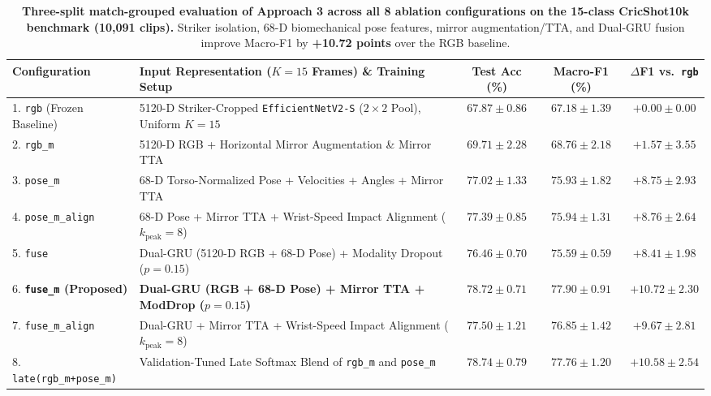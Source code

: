 \begin{table}[t]
\centering
\caption{\textbf{Three-split match-grouped evaluation of Approach 3 across all 8 ablation configurations on the 15-class CricShot10k benchmark (10,091 clips).} Striker isolation, 68-D biomechanical pose features, mirror augmentation/TTA, and Dual-GRU fusion improve Macro-F1 by \textbf{+10.72 points} over the RGB baseline.}
\label{tab:cricshot10k}
\small
\begin{tabular}{llccc}
\toprule
\textbf{Configuration} & \textbf{Input Representation ($K=15$ Frames) \& Training Setup} & \textbf{Test Acc (\%)} & \textbf{Macro-F1 (\%)} & \textbf{$\Delta$F1 vs.\ \texttt{rgb}} \\
\midrule
1. \texttt{rgb} (Frozen Baseline) & 5120-D Striker-Cropped \texttt{EfficientNetV2-S} ($2\times2$ Pool), Uniform $K=15$ & $67.87 \pm 0.86$ & $67.18 \pm 1.39$ & $+0.00 \pm 0.00$ \\
2. \texttt{rgb\_m} & 5120-D RGB + Horizontal Mirror Augmentation \& Mirror TTA & $69.71 \pm 2.28$ & $68.76 \pm 2.18$ & $+1.57 \pm 3.55$ \\
3. \texttt{pose\_m} & 68-D Torso-Normalized Pose + Velocities + Angles + Mirror TTA & $77.02 \pm 1.33$ & $75.93 \pm 1.82$ & $+8.75 \pm 2.93$ \\
4. \texttt{pose\_m\_align} & 68-D Pose + Mirror TTA + Wrist-Speed Impact Alignment ($k_{\text{peak}}=8$) & $77.39 \pm 0.85$ & $75.94 \pm 1.31$ & $+8.76 \pm 2.64$ \\
\midrule
5. \texttt{fuse} & Dual-GRU (5120-D RGB + 68-D Pose) + Modality Dropout ($p=0.15$) & $76.46 \pm 0.70$ & $75.59 \pm 0.59$ & $+8.41 \pm 1.98$ \\
6. \textbf{\texttt{fuse\_m} (Proposed)} & \textbf{Dual-GRU (RGB + 68-D Pose) + Mirror TTA + ModDrop ($p=0.15$)} & $\mathbf{78.72 \pm 0.71}$ & $\mathbf{77.90 \pm 0.91}$ & $\mathbf{+10.72 \pm 2.30}$ \\
7. \texttt{fuse\_m\_align} & Dual-GRU + Mirror TTA + Wrist-Speed Impact Alignment ($k_{\text{peak}}=8$) & $77.50 \pm 1.21$ & $76.85 \pm 1.42$ & $+9.67 \pm 2.81$ \\
8. \texttt{late(rgb\_m+pose\_m)} & Validation-Tuned Late Softmax Blend of \texttt{rgb\_m} and \texttt{pose\_m} & $\mathbf{78.74 \pm 0.79}$ & $77.76 \pm 1.20$ & $+10.58 \pm 2.54$ \\
\bottomrule
\end{tabular}
\end{table}

